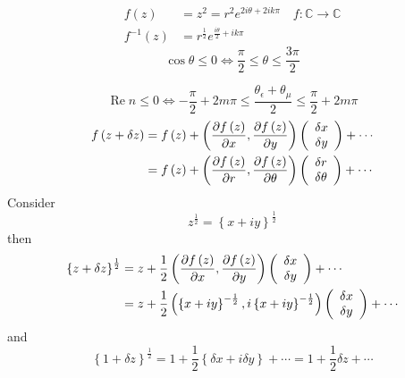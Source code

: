 \documentclass[aps,preprint]{revtex4}%
\begin{document}
\begin{align*}
f\left(  z\right)   &  =z^{2}=r^{2}e^{2i\theta+2ik\pi}\quad
f:\mathbb{C\rightarrow C}\\
f^{-1}\left(  z\right)   &  =r^{\frac{1}{2}}e^{\frac{i\theta}{2}+ik\pi}%
\end{align*}%
\[
\cos\theta\leq0\Leftrightarrow\frac{\pi}{2}\leq\theta\leq\frac{3\pi}{2}%
\]
%

\[
\operatorname{Re}n\leq0\Leftrightarrow-\frac{\pi}{2}+2m\pi\leq\frac
{\theta_{\epsilon}+\theta_{\mu}}{2}\leq\frac{\pi}{2}+2m\pi
\]%
\begin{align}
f\left(  z+\delta z\right)   &  =f\left(  z\right)  +\left(  \frac{\partial
f\left(  z\right)  }{\partial x},\frac{\partial f\left(  z\right)  }{\partial
y}\right)  \left(
\begin{array}
[c]{c}%
\delta x\\
\delta y
\end{array}
\right)  +\cdots\\
&  =f\left(  z\right)  +\left(  \frac{\partial f\left(  z\right)  }{\partial
r},\frac{\partial f\left(  z\right)  }{\partial\theta}\right)  \left(
\begin{array}
[c]{c}%
\delta r\\
\delta\theta
\end{array}
\right)  +\cdots
\end{align}
Consider
\begin{equation}
z^{\frac{1}{2}}=\left\{  x+iy\right\}  ^{\frac{1}{2}}%
\end{equation}
then%
\begin{align}
\left\{  z+\delta z\right\}  ^{\frac{1}{2}} &  =z+\frac{1}{2}\left(
\frac{\partial f\left(  z\right)  }{\partial x},\frac{\partial f\left(
z\right)  }{\partial y}\right)  \left(
\begin{array}
[c]{c}%
\delta x\\
\delta y
\end{array}
\right)  +\cdots\\
&  =z+\frac{1}{2}\left(  \left\{  x+iy\right\}  ^{-\frac{1}{2}},i\left\{
x+iy\right\}  ^{-\frac{1}{2}}\right)  \left(
\begin{array}
[c]{c}%
\delta x\\
\delta y
\end{array}
\right)  +\cdots
\end{align}
and
\begin{equation}
\left\{  1+\delta z\right\}  ^{\frac{1}{2}}=1+\frac{1}{2}\left\{  \delta
x+i\delta y\right\}  +\cdots=1+\frac{1}{2}\delta z+\cdots
\end{equation}%
\end{document}
